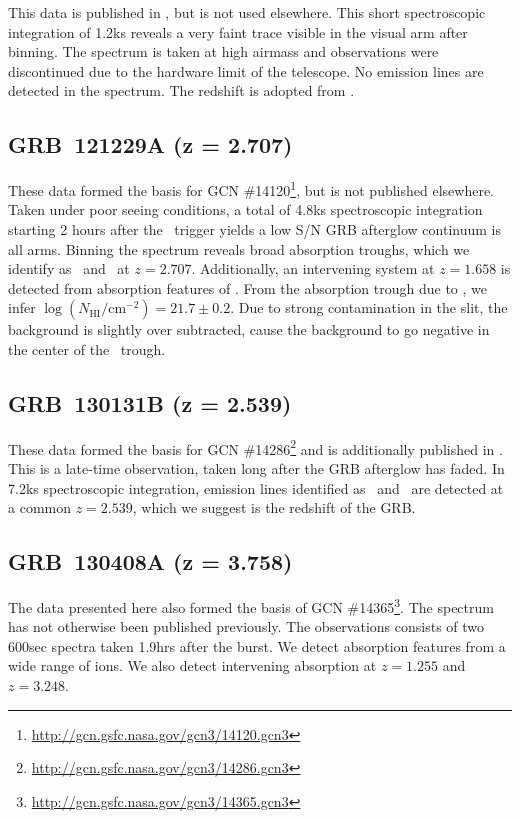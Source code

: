 \documentclass{aa}    %
\begin{document}
This data is published in \citet{Kruhler2015}, but is not used elsewhere. This
short spectroscopic integration of 1.2ks reveals a very faint trace visible in
the visual arm after binning. The spectrum is taken at high airmass and
observations were discontinued due to the hardware limit of the telescope. No
emission lines are detected in the spectrum. The redshift is adopted from
\citet{Kruhler2015}.

\subsection{GRB~121229A (z = 2.707)}

These data formed the basis for GCN
\#14120\footnote{\url{http://gcn.gsfc.nasa.gov/gcn3/14120.gcn3}}, but is not
published elsewhere. Taken under poor seeing conditions, a total of 4.8ks
spectroscopic integration starting 2 hours after the \swift~trigger yields a low
S/N GRB afterglow continuum is all arms. Binning the spectrum reveals broad
absorption troughs, which we identify as \lyb~and \lya~at $z = 2.707$.
Additionally, an intervening system at $z = 1.658$ is detected from absorption
features of \mgii. From the absorption trough due to \lya, we infer $\log
(N_{\mathrm{HI}}/\mathrm{cm}^{-2}) = 21.7 \pm 0.2$. Due to strong contamination
in the slit, the background is slightly over subtracted, cause the background to
go negative in the center of the \lya~trough.

\subsection{GRB~130131B (z = 2.539)}

These data formed the basis for GCN
\#14286\footnote{\url{http://gcn.gsfc.nasa.gov/gcn3/14286.gcn3}} and is
additionally published in \citet{Kruhler2015}. This is a late-time observation,
taken long after the GRB afterglow has faded. In 7.2ks spectroscopic
integration, emission lines identified as \oii~and \oiii~are detected at a
common $z = 2.539$, which we suggest is the redshift of the GRB.

\subsection{GRB~130408A (z = 3.758)}

The data presented here also formed the basis of GCN
\#14365\footnote{\url{http://gcn.gsfc.nasa.gov/gcn3/14365.gcn3}}. The spectrum
has not otherwise been published previously. The observations consists of two
600sec spectra taken 1.9hrs after the burst. We detect absorption features from
a wide range of ions. We also detect intervening absorption at $z=1.255$ and
$z=3.248$.
\end{document}
